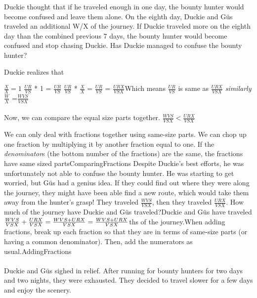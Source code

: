 \documentclass[a4paper,11pt ]{book}
\begin{document}
{Duckie thought that if he traveled enough in one day, the bounty hunter would become confused and leave them alone. On the eighth day, Duckie and Güs traveled an additional W/X of the journey. If Duckie traveled more on the eighth day than the combined previous 7 days, the bounty hunter would become confused and stop chasing Duckie. Has Duckie managed to confuse the bounty hunter?}{Duckie realizes that \begin{center}
    $\frac{X}{X}=1$ \linebreak
    $\frac{UR}{VS}$ * 1 = $\frac{UR}{VS}$ \linebreak
    $\frac{UR}{VS}$ * $\frac{X}{X}$ = $\frac{UR}{VS}$ = $\frac{URX}{VSX}$\linebreak  Which means $\frac{UR}{VS}$  is same as  $\frac{URX}{VSX}$ \linebreak\linebreak
    \textit{similarly}
    $\frac{W}{X}$ =$\frac{WVS}{VSX}$
\end{center}
\paragraph{} Now, we can compare the equal size parts together. $\frac{WVS}{VSX} < \frac{URX}{VSX}$}{We can only deal with fractions together using same-size parts. We can chop up one fraction by multiplying it by another fraction equal to one. If the \textit{denominator}s (the bottom number of the fractions) are the same, the fractions have same sized parts}{ComparingFractions}
{Despite Duckie's best efforts, he was unfortunately not able to confuse the bounty hunter. He was starting to get worried, but Güs had a genius idea. If they could find out where they were along the journey, they might have been able find a new route, which would take them away from the hunter's grasp! They traveled $\frac{WVS}{VSX}$, then they traveled $\frac{URX}{VSX}$. How much of the journey have Duckie and Güs traveled?}{Duckie and Güs have traveled
$\frac{WVS}{VSX}+\frac{URX}{VSX}\linebreak=\frac{WVS+URX}{VSX}\linebreak=\frac{WVS+URX}{VSX}$ths of the journey.}{When adding fractions, break up each fraction so that they are in terms of same-size parts (or having a common denominator). Then, add the numerators as usual.}{AddingFractions}
\paragraph{} Duckie and Güs sighed in relief. After running for bounty hunters for two days and two nights, they were exhausted. They decided to travel slower for a few days and enjoy the scenery. 
\end{document}
